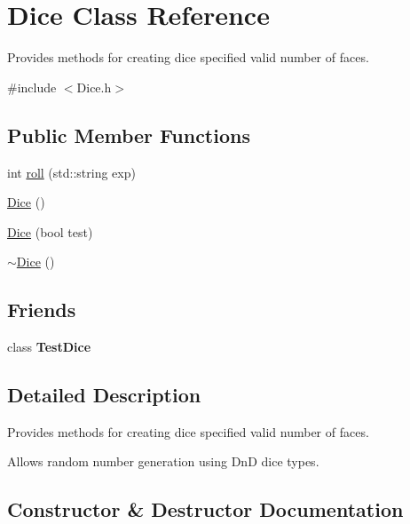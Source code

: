 \hypertarget{class_dice}{}\section{Dice Class Reference}
\label{class_dice}


Provides methods for creating dice specified valid number of faces.  




{\ttfamily \#include $<$Dice.\+h$>$}

\subsection*{Public Member Functions}
\begin{DoxyCompactItemize}
\item 
int \hyperlink{class_dice_a0bc8f4b697804af0785f34b801cd6feb}{roll} (std\+::string exp)
\item 
\hyperlink{class_dice_a6b9eadd945ad8fd3840379c8824e5d48}{Dice} ()
\item 
\hyperlink{class_dice_ad72fb3216967ca28dc6f81653f4c3c07}{Dice} (bool test)
\item 
\hyperlink{class_dice_a48e90392d2ff1e6736c88f22e8a87751}{$\sim$\+Dice} ()
\end{DoxyCompactItemize}
\subsection*{Friends}
\begin{DoxyCompactItemize}
\item 
\hypertarget{class_dice_a7cb71db64a34c9d95fe3f41ccbb1e8c7}{}\label{class_dice_a7cb71db64a34c9d95fe3f41ccbb1e8c7} 
class {\bfseries Test\+Dice}
\end{DoxyCompactItemize}


\subsection{Detailed Description}
Provides methods for creating dice specified valid number of faces. 

Allows random number generation using DnD dice types. 

\subsection{Constructor \& Destructor Documentation}
\hypertarget{class_dice_a6b9eadd945ad8fd3840379c8824e5d48}{}\label{class_dice_a6b9eadd945ad8fd3840379c8824e5d48} 
